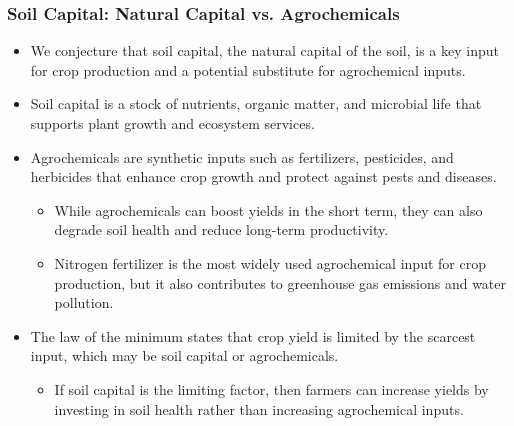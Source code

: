 \documentclass[xcolor = x11names, compress, aspectratio = 169]{beamer}
\renewcommand{\(}{\begin{columns}}
\renewcommand{\)}{\end{columns}}
\newcommand{\<}[1]{\begin{column}{#1}}
\renewcommand{\>}{\end{column}}
\begin{document}
    \begin{frame}
    \frametitle{Soil Capital: Natural Capital vs. Agrochemicals}
        \begin{itemize}
            \item We conjecture that soil capital, the natural capital of the soil, is a key input for crop production and a potential substitute for agrochemical inputs.
            \item Soil capital is a stock of nutrients, organic matter, and microbial life that supports plant growth and ecosystem services.
            \item Agrochemicals are synthetic inputs such as fertilizers, pesticides, and herbicides that enhance crop growth and protect against pests and diseases.
            \begin{itemize}
                \item While agrochemicals can boost yields in the short term, they can also degrade soil health and reduce long-term productivity.
                \item Nitrogen fertilizer is the most widely used agrochemical input for crop production, but it also contributes to greenhouse gas emissions and water pollution. 
            \end{itemize}
            \item The law of the minimum states that crop yield is limited by the scarcest input, which may be soil capital or agrochemicals. {\scriptsize\citep{Brisson2010}}
            \begin{itemize}
                \item If soil capital is the limiting factor, then farmers can increase yields by investing in soil health rather than increasing agrochemical inputs.
            \end{itemize}
        \end{itemize}
    \end{frame}
\end{document}
